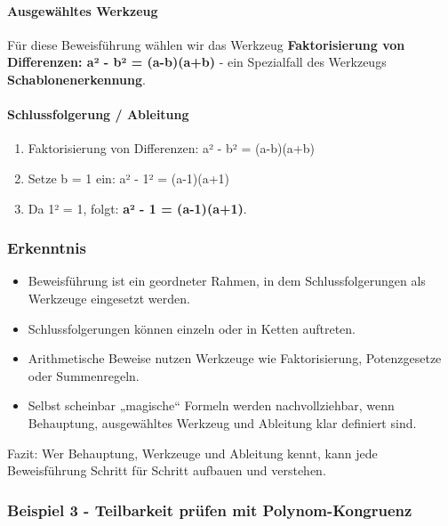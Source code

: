\documentclass{article}
\begin{document}
      \paragraph{Ausgewähltes Werkzeug}
      
Für diese Beweisführung wählen wir das Werkzeug \textbf{Faktorisierung von Differenzen: a² - b² = (a-b)(a+b)} - ein Spezialfall des Werkzeugs \textbf{Schablonenerkennung}.


      \paragraph{Schlussfolgerung / Ableitung}
      \begin{enumerate}
        \item Faktorisierung von Differenzen: a² - b² = (a-b)(a+b)

        \item Setze b = 1 ein: a² - 1² = (a-1)(a+1)

        \item Da 1² = 1, folgt: \textbf{a² - 1 = (a-1)(a+1)}.

      \end{enumerate}

      \subsubsection{Erkenntnis}
      \begin{itemize}
        \item Beweisführung ist ein geordneter Rahmen, in dem Schlussfolgerungen als Werkzeuge eingesetzt werden.

        \item Schlussfolgerungen können einzeln oder in Ketten auftreten.

        \item Arithmetische Beweise nutzen Werkzeuge wie Faktorisierung, Potenzgesetze oder Summenregeln.

        \item Selbst scheinbar „magische“ Formeln werden nachvollziehbar, wenn Behauptung, ausgewähltes Werkzeug und Ableitung klar definiert sind.

      \end{itemize}

      
Fazit: Wer Behauptung, Werkzeuge und Ableitung kennt, kann jede Beweisführung Schritt für Schritt aufbauen und verstehen.


      \subsubsection{Beispiel 3 - Teilbarkeit prüfen mit Polynom-Kongruenz}
      
\end{document}
